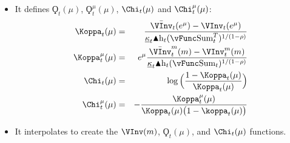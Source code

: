 \documentclass[titlepage,abstract]{\econtex}
\providecommand{\vSum}{\vFunc\text{Sum}}
\providecommand{\Deltah}{\blacktriangle \mathrm{h}}
\begin{document}
\begin{itemize}
        \item It defines $\ensuremath{\Koppa}_{t}(\mu)$, $\ensuremath{\Koppa}_{t}^{\mu}(\mu)$, $\Chi_{t}(\mu)$ and $\Chi_{t}^{\mu}(\mu)$:
            \begin{eqnarray}
            \Koppa_{t} (\mu) &=& \frac{\bar{\VInv}_{t} (e^{\mu}) -\VInv_{t} (e^{\mu})}{\underline{\kappa}_{t} \Deltah_{t} (\vSum_{t}^{T})^{1/(1-\rho)}} \\
            \Koppa_{t}^{\mu} (\mu) &=& e^{\mu} \frac{\bar{\VInv}_{t}^{m} (m)- \VInv_{t}^{m} (m)}{\underline{\kappa}_{t} \Deltah_{t} (\vSum_{t})^{1/(1-\rho)}} \\
            \Chi_{t} (\mu) &=& \log\Big(\frac{1-\Koppa_{t} (\mu)}{\Koppa_{t} (\mu) }\Big) \\
            \Chi_{t}^{\mu} (\mu) &=& -\frac{\Koppa_{t}^{\mu}(\mu)}{\Koppa_{t} (\mu)\big(1-\koppa_{t} (\mu)\big)}
            \end{eqnarray}
        \item It interpolates to create the $\VInv(m)$, $\ensuremath{\Koppa}_{t}(\mu)$, and $\Chi_{t}(\mu)$ functions.
        \end{itemize}
\end{document}
